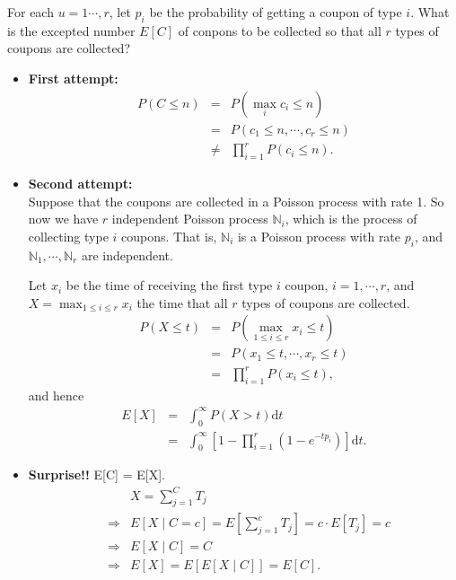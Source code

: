\begin{example}
For each $ u = 1 \cdots, r $, let $ p_{i} $ be the probability of getting a coupon of type $ i $. What is the excepted number $ E[C] $ of conpons to be collected so that all $ r $ types of coupons are collected?

\begin{itemize}
\item \textbf{First attempt:}
\begin{eqnarray*}
P(C \le n)
  & = & P \left( \max_{i} c_{i} \le n \right) \\
  & = & P(c_{1} \le n, \cdots, c_{r} \le n) \\
  & \neq & \prod_{i = 1}^{r} P(c_{i} \le n).
\end{eqnarray*}

\item \textbf{Second attempt:} \\
Suppose that the coupons are collected in a Poisson process with rate 1. So now we have $ r $ independent Poisson process $ \mathbb{N}_{i} $, which is the process of collecting type $ i $ coupons. That is, $ \mathbb{N}_{i} $ is a Poisson process with rate $ p_{i} $, and $ \mathbb{N}_{1}, \cdots, \mathbb{N}_{r} $ are independent.

Let $ x_{i} $ be the time of receiving the first type $ i $ coupon, $ i = 1, \cdots, r $, and $ X = \max_{1 \le i \le r} x_{i} $ the time that all $ r $ types of coupons are collected.
\begin{eqnarray*}
P(X \le t)
  & = & P \left( \max_{1 \le i \le r} x_{i} \le t \right) \\
  & = & P(x_{1} \le t, \cdots, x_{r} \le t) \\
  & = & \prod_{i = 1}^{r} P(x_{i} \le t),
\end{eqnarray*}
and hence
\begin{eqnarray*}
E[X]
  & = & \int_{0}^{\infty} P(X > t) \mathrm{d}t \\
  & = & \int_{0}^{\infty} \left[ 1 - \prod_{i = 1}^{r} (1 - e^{-tp_{i}}) \right] \mathrm{d}t.
\end{eqnarray*}

\item \textbf{Surprise!!} E[C] = E[X].
\begin{eqnarray*}
  &   & X = \sum_{j = 1}^{C} T_{j} \\
  & \Rightarrow & E[X \mid C = c] = E \left[ \sum_{j = 1}^{c} T_{j} \right] = c \cdot E[T_{j}] = c \\
  & \Rightarrow & E[X \mid C] = C \\
  & \Rightarrow & E[X] = E[E[X \mid C]] = E[C].
\end{eqnarray*}
\end{itemize}
\end{example}

